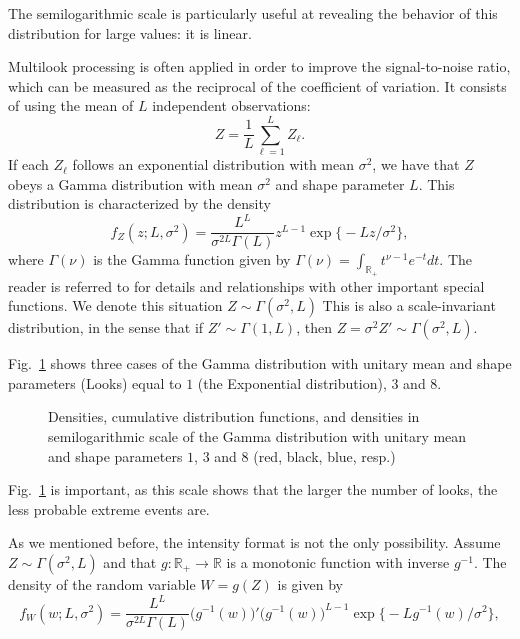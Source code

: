The semilogarithmic scale is particularly useful at revealing the behavior of this distribution for large values: it is linear.

Multilook processing is often applied in order to improve the signal-to-noise ratio, which can be measured as the reciprocal of the coefficient of variation.
It consists of using the mean of $L$ independent observations:
\begin{equation}
Z = \frac1L \sum_{\ell=1}^{L} Z_\ell.
\end{equation}
If each $Z_\ell$ follows an exponential distribution with mean $\sigma^2$, we have that $Z$ obeys a Gamma distribution with mean $\sigma^2$ and shape parameter $L$.
This distribution is characterized by the density
\begin{equation}
f_Z(z;L,\sigma^2) = \frac{L^L}{\sigma^{2L}\Gamma(L)} z^{L-1} 
	\exp\big\{ -L z / \sigma^2
	\big\},
\end{equation}
where $\Gamma(\nu)$ is the Gamma function given by $\Gamma(\nu)=\int_{\mathbb R_+} t^{\nu-1} e^{-t} dt$.
The reader is referred to \citet{abramo-stegu64} for details and relationships with other important special functions.
We denote this situation $Z\sim\Gamma(\sigma^2,L)$
This is also a scale-invariant distribution, in the sense that if $Z'\sim\Gamma(1,L)$, then $Z=\sigma^2 Z'\sim \Gamma(\sigma^2,L)$.

Fig.~\ref{Fig:GammaDistribution} shows three cases of the Gamma distribution with unitary mean and shape parameters (Looks) equal to $1$ (the Exponential distribution), $3$ and $8$.

\begin{figure}[hbt]
\centering
{}
\caption{Densities, cumulative distribution functions, and densities in semilogarithmic scale of the Gamma distribution with unitary mean and shape parameters $1$, $3$ and $8$ (red, black, blue, resp.)}\label{Fig:GammaDistribution}
\end{figure}

Fig.~\ref{Fig:GammaDistribution} is important, as this scale shows that the larger the number of looks, the less probable extreme events are.

As we mentioned before, the intensity format is not the only possibility.
Assume $Z\sim\Gamma(\sigma^2,L)$ and that $g\colon\mathbb R_+ \to \mathbb R$ is a monotonic function with inverse $g^{-1}$.
The density of the random variable $W = g(Z)$ is given by 
\begin{equation}
f_W(w;L,\sigma^2) = \frac{L^L}{\sigma^{2L}\Gamma(L)} (g^{-1}(w)\big)' \big(g^{-1}(w)\big)^{L-1} 
	\exp\big\{ -L g^{-1}(w) / \sigma^2
	\big\},
	\label{eq:GammmaTransformed}
\end{equation}

